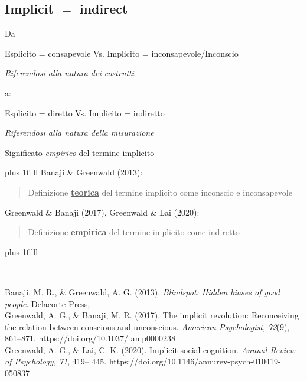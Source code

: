 \documentclass{beamer}
\begin{document}
\subsection*{Implicit $=$ indirect}


\begin{frame}
	
	\begin{center}
		Da
		
		\vspace{3.5mm}
		Esplicito = consapevole Vs. Implicito = inconsapevole/Inconscio  
		
		\emph{Riferendosi alla natura dei costrutti}
		\vspace{3.5mm}
		
		a:
		
		\vspace{3.5mm}
		Esplicito = diretto Vs. Implicito = indiretto 
		
		\emph{Riferendosi alla natura della misurazione}
	\end{center}
	
	\vspace{3.5mm}
	Significato \emph{empirico} del termine implicito
\end{frame}

\begin{frame}
	\vskip0pt plus 1filll
	Banaji \& Greenwald (2013): 
	
	\vspace{5mm}
	\begin{quote}
		Definizione \underline{\textbf{teorica}} del termine implicito come inconscio e inconsapevole
	\end{quote}
	
	\vspace{5mm}
	Greenwald \& Banaji (2017), Greenwald \& Lai (2020): 
	
	\vspace{5mm}
	\begin{quote}
		
		Definizione \underline{\textbf{empirica}} del termine implicito come indiretto 
		
	\end{quote}
	\vskip0pt plus 1filll
	
	\color{template}\rule{0.30\linewidth}{0.5pt}\\
	\color{black}
	\scriptsize{Banaji, M. R., \& Greenwald, A. G. (2013). \emph{Blindspot:
			Hidden biases of good people}. Delacorte Press,\\ 
		Greenwald, A. G., \& Banaji, M. R. (2017). The
		implicit revolution: Reconceiving the relation
		between conscious and unconscious. \emph{American Psychologist, 72}(9), 861–871. https://doi.org/10.1037/
		amp0000238\\
		Greenwald, A. G., \& Lai, C. K. (2020). Implicit social
		cognition. \emph{Annual Review of Psychology, 71}, 419–
		445. https://doi.org/10.1146/annurev-psych-010419-
		050837
	}
\end{frame}
\end{document}
